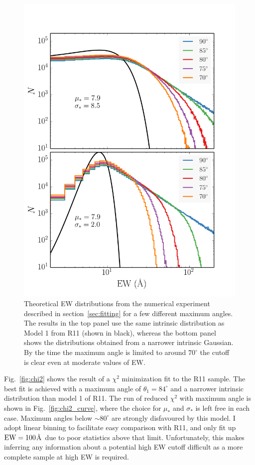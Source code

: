 \begin{figure}
\centering
\includegraphics[width=1.0\textwidth]{figures/ewpaper/cutoff.png}
\caption
{
Theoretical EW distributions from the numerical experiment 
described in section~\ref{sec:fitting} for a few different 
maximum angles. The results in the top panel use the same intrinsic
distribution as Model 1 from R11 (shown in black), 
whereas the bottom panel shows the distributions 
obtained from a narrower intrinsic Gaussian. By the time the maximum
angle is limited to around $70^\circ$ the cutoff is
clear even at moderate values of EW.
}
\label{fig:cutoff}
\end{figure}

Fig.~\ref{fig:chi2} shows the result of a $\chi^2$ minimization fit 
to the R11 sample. The best fit is achieved with a maximum angle of 
$\theta_{1}=84^\circ$ and a narrower intrinsic distribution
than model 1 of R11. The run of reduced $\chi^2$ with maximum angle
is shown in Fig.~\ref{fig:chi2_curve}, where the choice for $\mu_*$
and $\sigma_*$ is left free in each case. 
Maximum angles below $\sim80^\circ$ are strongly disfavoured
by this model. I adopt linear binning to facilitate easy comparison 
with R11, and only fit up ${\rm EW}=100$\AA\
due to poor statistics above that limit. Unfortunately, this 
makes inferring any information about a potential high EW cutoff 
difficult as a more complete sample at high EW is required. 

